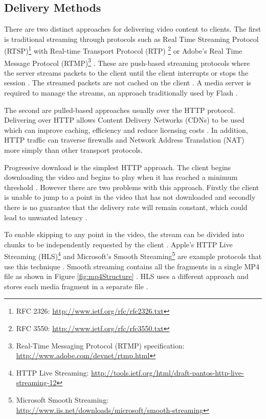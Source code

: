 \documentclass[journal]{IEEEtran}
\begin{document}
\subsection{Delivery Methods}
There are two distinct approaches for delivering video content to clients. The first is traditional streaming through protocols such as Real Time Streaming Protocol (RTSP)\footnote{RFC 2326: \url{http://www.ietf.org/rfc/rfc2326.txt}} with Real-time Transport Protocol (RTP) \footnote{RFC 3550: \url{http://www.ietf.org/rfc/rfc3550.txt}} or Adobe's Real Time Message Protocol (RTMP)\footnote{Real-Time Messaging Protocol (RTMP) specification: \url{http://www.adobe.com/devnet/rtmp.html}} \cite{article:areWeInTheMiddleOfAVideoStreamingRevolution}. These are push-based streaming protocols where the server streams packets to the client until the client interrupts or stops the session \cite{article:watchingVideoOverTheWeb}. The streamed packets are not cached on the client \cite{article:watchingVideoOverTheWeb}. A media server is required to manage the streams, an approach traditionally used by Flash \cite{article:flashPlayer}.

The second are pulled-based approaches usually over the HTTP protocol. Delivering over HTTP allows Content Delivery Networks (CDNs) to be used which can improve caching, efficiency and reduce licensing costs \cite{article:towardsVideoOnTheWebWithHTML5}\cite{inproceedings:HTTPAsTheNarrowWaist}. In addition, HTTP traffic can traverse firewalls and Network Address Translation (NAT) more simply than other transport protocols. %

Progressive download is the simplest HTTP approach. The client begins downloading the video and begins to play when it has reached a minimum threshold \cite{article:watchingVideoOverTheWeb}. However there are two problems with this approach. Firstly the client is unable to jump to a point in the video that has not downloaded and secondly there is no guarantee that the delivery rate will remain constant, which could lead to unwanted latency \cite{article:towardsVideoOnTheWebWithHTML5}. %

To enable skipping to any point in the video, the stream can be divided into chunks to be independently requested by the client \cite{article:areWeInTheMiddleOfAVideoStreamingRevolution}. Apple's HTTP Live Streaming (HLS)\footnote{HTTP Live Streaming: \url{http://tools.ietf.org/html/draft-pantos-http-live-streaming-12}} and Microsoft's Smooth Streaming\footnote{Microsoft Smooth Streaming: \url{http://www.iis.net/downloads/microsoft/smooth-streaming}} are example protocols that use this technique \cite{article:watchingVideoOverTheWeb}. Smooth streaming contains all the fragments in a single MP4 file as shown in Figure \ref{fig:mp4Structure} \cite{article:watchingVideoOverTheWeb}. HLS uses a different approach and stores each media fragment in a separate file \cite{article:watchingVideoOverTheWeb}.
\end{document}
